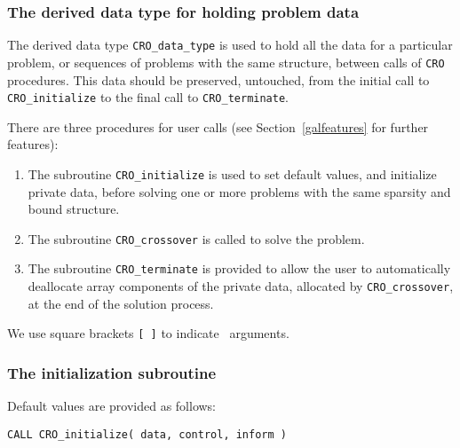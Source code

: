 \documentclass{galahad}
\newcommand{\packagename}{CRO}
\begin{document}

\subsubsection{The derived data type for holding problem data}\label{typedata}
The derived data type
{\tt \packagename\_data\_type}
is used to hold all the data for a particular problem,
or sequences of problems with the same structure, between calls of
{\tt \packagename} procedures.
This data should be preserved, untouched, from the initial call to
{\tt \packagename\_initialize}
to the final call to
{\tt \packagename\_terminate}.


\galarguments
There are three procedures for user calls
(see Section~\ref{galfeatures} for further features):

\begin{enumerate}
\item The subroutine
      {\tt \packagename\_initialize}
      is used to set default values, and initialize private data,
      before solving one or more problems with the
      same sparsity and bound structure.
\item The subroutine
      {\tt \packagename\_crossover}
      is called to solve the problem.
\item The subroutine
      {\tt \packagename\_terminate}
      is provided to allow the user to automatically deallocate array
       components of the private data, allocated by
       {\tt \packagename\_crossover},
       at the end of the solution process.
\end{enumerate}
We use square brackets {\tt [ ]} to indicate \optional\ arguments.


\subsubsection{The initialization subroutine}\label{subinit}
 Default values are provided as follows:
\vspace*{1mm}

\hspace{8mm}
{\tt CALL \packagename\_initialize( data, control, inform )}
\end{document}
